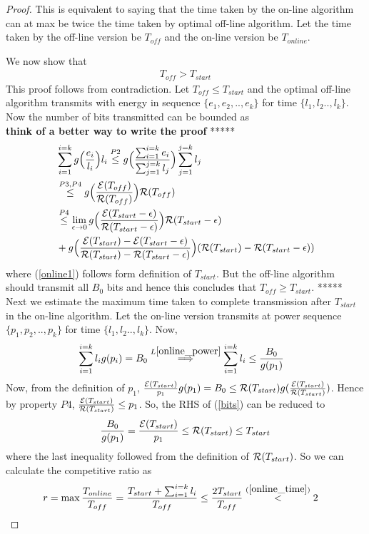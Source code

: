 \begin{proof}
This is equivalent to saying that the time taken by the on-line algorithm can at max be twice the time taken by optimal off-line algorithm. Let the time taken by the off-line version be $T_{off}$ and the on-line version be $T_{online}$. 

We now show that 
\begin{align}
T_{off} > T_{start}
\label{online_time}
\end{align}
This proof follows from contradiction. Let $T_{off}\le T_{start}$ and the optimal off-line algorithm transmits with energy in sequence $\{e_1,e_2,..,e_k\}$ for time $\{l_1,l_2..,l_k\} $. Now the number of bits transmitted can be bounded as
\\
\textbf{think of a better way to write the proof}
*****
\begin{align}
&\sum_{i=1}^{i=k} g\Big{(}\frac{e_i}{l_i}\Big{)}l_i\stackrel{P2}{\le} g\Big{(}\frac{\sum_{i=1}^{i=k}e_i}{\sum_{j=1}^{j=k}l_j}\Big{)} \sum_{j=1}^{j=k} l_j 
\\
&\stackrel{P3,P4}{\le} g\Big{(}\frac{\ETx(T_{off})}{\TRx(T_{off})}\Big{)} \TRx(T_{off})
\\
&\stackrel{P4}{\le}\lim_{\epsilon \rightarrow 0} g\Big{(}\frac{\ETx(T_{start}-\epsilon)}{\TRx(T_{start}-\epsilon)}\Big{)} \TRx(T_{start}-\epsilon)
\\
&+ g\Big{(}\frac{\ETx(T_{start})-\ETx(T_{start}-\epsilon)}{\TRx(T_{start})-\TRx(T_{start}-\epsilon)}\Big{)} (\TRx(T_{start})-\TRx(T_{start}-\epsilon)) \label{online1}
\end{align}
where (\ref{online1}) follows form definition of $T_{start}$. But the off-line algorithm should transmit all $B_0$ bits and hence this concludes that $T_{off}\ge T_{start}$.
*****
\\
Next we estimate the maximum time taken to complete transmission after $T_{start}$ in the on-line algorithm. Let the on-line version transmits at power sequence $\{p_1,p_2,..,p_k\}$ for time $\{l_1,l_2..,l_k\} $. Now,
\begin{align}
&\sum_{i=1}^{i=k}l_ig(p_i)=B_0\stackrel{L\ref{online_power}}{\implies}\sum_{i=1}^{i=k}l_i\le \frac{B_0}{g(p_1)}\label{bits}
\end{align}
Now, from the definition of $p_1$, $\frac{\mathcal{E}(T_{start})}{p_1}g(p_1)=B_0 \le \mathcal{R}(T_{start}) g(\frac{\mathcal{E}(T_{start})}{\mathcal{R}(T_{start})})$. Hence by property $P4$, $\frac{\mathcal{E}(T_{start})}{\mathcal{R}(T_{start})}\le p_1$. So, the RHS of (\ref{bits}) can be reduced to 
\begin{align}
&\frac{B_0}{g(p_1)} = \frac{\mathcal{E}(T_{start})}{p_1} \le \mathcal{R}(T_{start})\le T_{start}
\\
\end{align}
where the last inequality followed from the definition of $\mathcal{R}(T_{start})$. So we can calculate the competitive ratio as
\begin{align*}
&r=\max\dfrac{T_{online}}{T_{off}} = \dfrac{T_{start}+\sum_{i=1}^{i=k}l_i}{T_{off}} \le \dfrac{2 T_{start}}{T_{off}} \stackrel{(\ref{online_time})}{<} 2
\end{align*}      
\end{proof}
